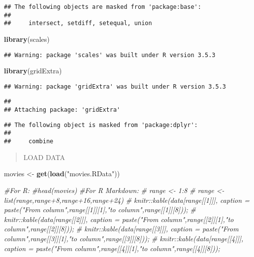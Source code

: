 \documentclass[]{article}
\newenvironment{Shaded}{\begin{snugshade}}{\end{snugshade}}
\newcommand{\KeywordTok}[1]{\textcolor[rgb]{0.13,0.29,0.53}{\textbf{#1}}}
\newcommand{\StringTok}[1]{\textcolor[rgb]{0.31,0.60,0.02}{#1}}
\newcommand{\CommentTok}[1]{\textcolor[rgb]{0.56,0.35,0.01}{\textit{#1}}}
\newcommand{\NormalTok}[1]{#1}
\begin{document}
\begin{verbatim}
## The following objects are masked from 'package:base':
## 
##     intersect, setdiff, setequal, union
\end{verbatim}

\begin{Shaded}
\begin{Highlighting}[]
\KeywordTok{library}\NormalTok{(scales)}
\end{Highlighting}
\end{Shaded}

\begin{verbatim}
## Warning: package 'scales' was built under R version 3.5.3
\end{verbatim}

\begin{Shaded}
\begin{Highlighting}[]
\KeywordTok{library}\NormalTok{(gridExtra)}
\end{Highlighting}
\end{Shaded}

\begin{verbatim}
## Warning: package 'gridExtra' was built under R version 3.5.3
\end{verbatim}

\begin{verbatim}
## 
## Attaching package: 'gridExtra'
\end{verbatim}

\begin{verbatim}
## The following object is masked from 'package:dplyr':
## 
##     combine
\end{verbatim}

\begin{quote}
LOAD DATA
\end{quote}

\begin{Shaded}
\begin{Highlighting}[]
\NormalTok{movies <-}\StringTok{ }\KeywordTok{get}\NormalTok{(}\KeywordTok{load}\NormalTok{(}\StringTok{"movies.RData"}\NormalTok{))}
\end{Highlighting}
\end{Shaded}

\begin{Shaded}
\begin{Highlighting}[]
  \CommentTok{#For R: }
\CommentTok{#head(movies) }
  \CommentTok{#For R Markdown:}
\CommentTok{# range <- 1:8}
\CommentTok{# range <- list(range,range+8,range+16,range+24)}
\CommentTok{# knitr::kable(data[range[[1]]], caption = paste("From column",range[[1]][1],"to column",range[[1]][8]));}
\CommentTok{# knitr::kable(data[range[[2]]], caption = paste("From column",range[[2]][1],"to column",range[[2]][8]));}
\CommentTok{# knitr::kable(data[range[[3]]], caption = paste("From column",range[[3]][1],"to column",range[[3]][8]));}
\CommentTok{# knitr::kable(data[range[[4]]], caption = paste("From column",range[[4]][1],"to column",range[[4]][8]));}
\end{Highlighting}
\end{Shaded}
\end{document}
